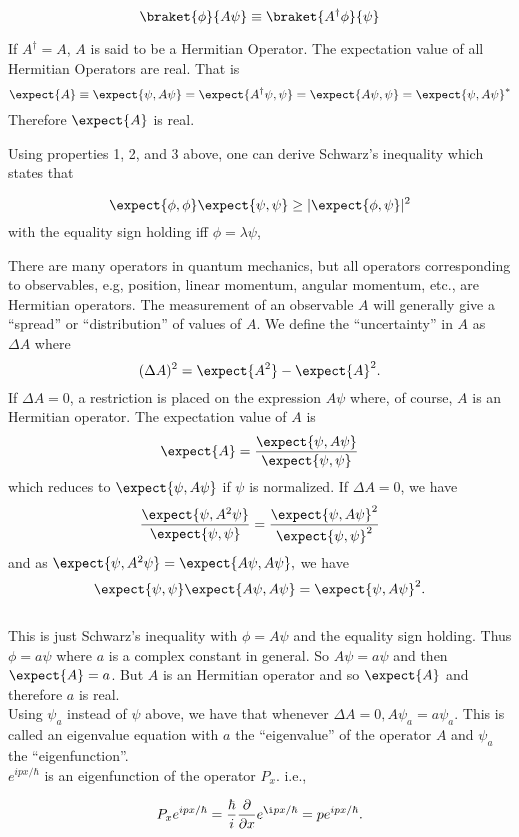 $$ \braket{\phi}{A\psi} \equiv \braket{A^\dagger \phi}{\psi}$$

If $A^\dagger = A$, $A$ is said to be a Hermitian Operator. The expectation value of all Hermitian Operators are real. That is 
$$ \expect{A} \equiv \expect{\psi,A\psi} = \expect{A^\dagger\psi,\psi} = \expect{A\psi,\psi} = \expect{\psi,A\psi}^*$$
Therefore $\expect{A}$ is real. 

Using properties 1, 2, and 3 above, one can derive Schwarz's inequality which states that 

\[ \expect{\phi,\phi}\expect{\psi,\psi} \ge |\expect{\phi,\psi}|^2 \] with the equality sign holding iff $\phi = \lambda \psi$,

There are many operators in quantum mechanics, but all operators corresponding to observables, e.g, position, linear momentum, 
angular momentum, etc., are Hermitian operators. The measurement of an observable $A$ will generally give a ``spread'' or ``distribution''
of values of $A$. We define the ``uncertainty'' in $A$ as $\Delta A$ where 
\[ (\Delta A)^2 = \expect{A^2} - \expect{A}^2. \]
If $\Delta A = 0$, a restriction is placed on the expression $A\psi$ where, of course, $A$ is an Hermitian operator. The expectation 
value of $A$ is \[ \expect{A} = { \expect{\psi,A\psi}\over \expect{\psi,\psi}}\] which reduces to $\expect{\psi, A\psi}$ if $\psi$ is normalized.
If $\Delta A = 0$, we have 
\[ { \expect{\psi, A^2 \psi} \over \expect{\psi,\psi}} = { \expect{\psi,A\psi}^2\over \expect{\psi,\psi}^2} \] and as 
$\expect{\psi,A^2 \psi } = \expect{A\psi,A\psi},$ we have 
\[ \expect{\psi,\psi}\expect{A\psi,A\psi} = \expect{\psi,A\psi}^2. \] \\

This is just Schwarz's inequality with $\phi = A\psi$ and the equality sign holding. Thus $\phi = a\psi$ where $a$ is a complex constant
in general. So $A \psi = a\psi$ and then $\expect{A} = a$. But $A$ is an Hermitian operator and so $\expect{A}$ and therefore $a$ is real.\\

Using $\psi_a$ instead of $\psi$ above, we have that whenever $\Delta A = 0, A\psi_a = a \psi_a$. This is called an eigenvalue equation
with $a$ the ``eigenvalue'' of the operator $A$ and $\psi_a$ the ``eigenfunction''.\\

$e^{ {ipx / \hbar}}$ is an eigenfunction of the operator $P_x$. i.e., 

\[ P_x e^{ipx/\hbar} = {\hbar\over i} {\partial \over \partial x} e^{\i px/\hbar} = p e^{ipx/\hbar}.\]

